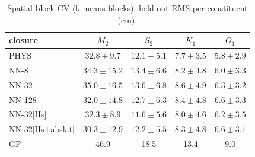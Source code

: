 \begin{table}[t]\centering\footnotesize
\caption{Spatial-block CV (k-means blocks): held-out RMS per constituent (cm).}
\label{tab:blockpc}
\begin{tabular}{lcccc}
\toprule
closure & $M_2$ & $S_2$ & $K_1$ & $O_1$ \\
\midrule
\textsc{PHYS} & $32.8\pm9.7$ & $12.1\pm5.1$ & $7.7\pm3.5$ & $5.8\pm2.9$ \\
\textsc{NN-8} & $34.3\pm15.2$ & $13.4\pm6.6$ & $8.2\pm4.8$ & $6.0\pm3.3$ \\
\textsc{NN-32} & $35.0\pm16.5$ & $13.6\pm6.8$ & $8.6\pm4.9$ & $6.3\pm3.2$ \\
\textsc{NN-128} & $32.0\pm14.8$ & $12.7\pm6.3$ & $8.4\pm4.8$ & $6.6\pm3.3$ \\
\textsc{NN-32}[Hs] & $32.3\pm8.9$ & $11.6\pm5.6$ & $8.0\pm4.6$ & $6.2\pm3.5$ \\
\textsc{NN-32}[Hs+abslat] & $30.3\pm12.9$ & $12.2\pm5.5$ & $8.3\pm4.8$ & $6.6\pm3.1$ \\
GP & 46.9 & 18.5 & 13.4 & 9.0 \\
\bottomrule
\end{tabular}
\end{table}
